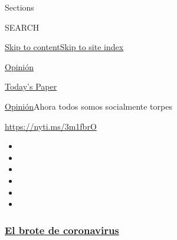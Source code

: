 Sections

SEARCH

\protect\hyperlink{site-content}{Skip to
content}\protect\hyperlink{site-index}{Skip to site index}

\href{https://www.nytimes3xbfgragh.onion/es/section/opinion}{Opinión}

\href{https://myaccount.nytimes3xbfgragh.onion/auth/login?response_type=cookie\&client_id=vi}{}

\href{https://www.nytimes3xbfgragh.onion/section/todayspaper}{Today's
Paper}

\href{/es/section/opinion}{Opinión}\textbar{}Ahora todos somos
socialmente torpes

\url{https://nyti.ms/3m1fbrO}

\begin{itemize}
\item
\item
\item
\item
\item
\item
\end{itemize}

\hypertarget{el-brote-de-coronavirus}{%
\subsubsection{\texorpdfstring{\href{https://www.nytimes3xbfgragh.onion/es/spotlight/coronavirus?name=styln-coronavirus-es\&region=TOP_BANNER\&block=storyline_menu_recirc\&action=click\&pgtype=Article\&impression_id=fba36710-f2af-11ea-a5f1-d358cc56c051\&variant=undefined}{El
brote de
coronavirus}}{El brote de coronavirus}}\label{el-brote-de-coronavirus}}

